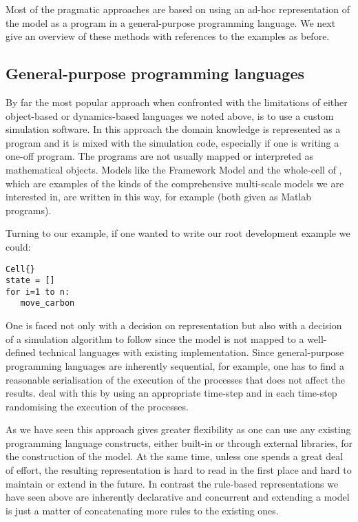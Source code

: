 \documentclass[phd]{infthesis}
\begin{document}
Most of the pragmatic approaches are based on using an ad-hoc representation of
the model as a program in a general-purpose programming language. We next give
an overview of these methods with references to the examples as before.


\subsection{General-purpose programming languages}
By far the most popular approach when confronted with the limitations of either
object-based or dynamics-based languages we noted above, is to use a custom
simulation software. In this approach the domain knowledge is represented as a
program and it is mixed with the simulation code, especially if one is writing a
one-off program. The programs are not usually mapped or interpreted as
mathematical objects. Models like the Framework Model \citep{chew2014multiscale}
and the whole-cell of \citet{karr_whole-cell_2012}, which are examples of the
kinds of the comprehensive multi-scale models we are interested in, are written
in this way, for example (both given as Matlab programs).

Turning to our example, if one wanted to write our root development example we
could:

\begin{verbatim}
Cell{}
state = []
for i=1 to n:
   move_carbon
\end{verbatim}

One is faced not only with a decision on representation but also with a decision
of a simulation algorithm to follow since the model is not mapped to a
well-defined technical languages with existing implementation. Since
general-purpose programming languages are inherently sequential, for example,
one has to find a reasonable serialisation of the execution of the processes
that does not affect the results. \citet{karr_whole-cell_2012} deal with this by
using an appropriate time-step and in each time-step randomising the execution
of the processes.

As we have seen this approach gives greater flexibility as one can use any
existing programming language constructs, either built-in or through external
libraries, for the construction of the model. At the same time, unless one
spends a great deal of effort, the resulting representation is hard to read in
the first place and hard to maintain or extend in the future. In contrast the
rule-based representations we have seen above are inherently declarative and
concurrent and extending a model is just a matter of concatenating more rules to
the existing ones.
\end{document}

